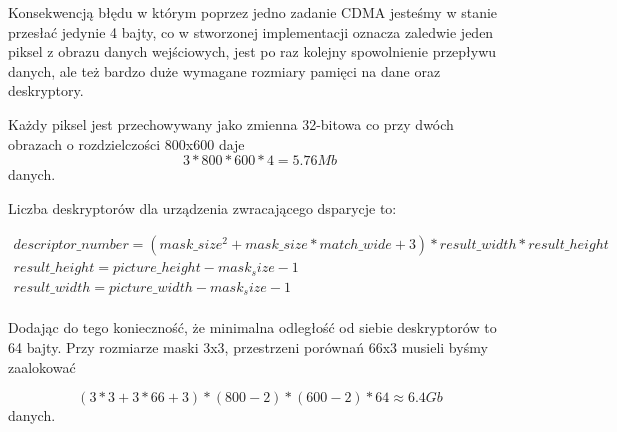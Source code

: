 Konsekwencją błędu w którym poprzez jedno zadanie CDMA jesteśmy w stanie przesłać jedynie 4 bajty,
    co w stworzonej implementacji oznacza zaledwie jeden piksel z obrazu danych wejściowych,
    jest po raz kolejny spowolnienie przepływu danych, ale też bardzo duże wymagane
    rozmiary pamięci na dane oraz deskryptory.

Każdy piksel jest przechowywany jako zmienna 32-bitowa co przy dwóch obrazach
o rozdzielczości 800x600 daje 
\begin{equation}
3*800*600*4=5.76 Mb
\label{eq:pixelsize}
\end{equation}
danych.

Liczba deskryptorów dla urządzenia zwracającego dsparycje to:

\begin{eqnarray}
descriptor\_number=(mask\_size^2 + mask\_size * match\_wide + 3) * result\_width * result\_height \\
result\_height = picture\_height - mask_size - 1 \\
result\_width = picture\_width - mask_size - 1 \\
\label{eq:descnum}
\end{eqnarray}

Dodając do tego konieczność, że minimalna odległość od siebie deskryptorów to 64 bajty.
Przy rozmiarze maski 3x3, przestrzeni porównań 66x3 musieli byśmy zaalokować

\begin{equation}
(3 * 3 + 3 * 66 + 3) * (800-2) * (600-2) * 64 \approx 6.4 Gb
\label{eq:picsize}
\end{equation}
danych.
